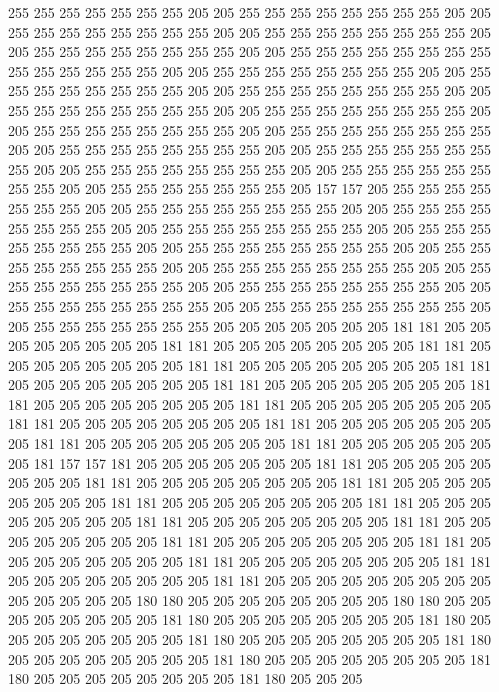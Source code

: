 255 255 255 255 255 255 255 205 205 255 255 255 255 255 255 255 255 205 205 255
255 255 255 255 255 255 255 205 205 255 255 255 255 255 255 255 255 205 205 255
255 255 255 255 255 255 255 205 205 255 255 255 255 255 255 255 255 255 255 255
255 255 255 205 205 255 255 255 255 255 255 255 255 205 205 255 255 255 255 255
255 255 255 205 205 255 255 255 255 255 255 255 255 205 205 255 255 255 255 255
255 255 255 205 205 255 255 255 255 255 255 255 255 205 205 255 255 255 255 255
255 255 255 205 205 255 255 255 255 255 255 255 255 205 205 255 255 255 255 255
255 255 255 205 205 255 255 255 255 255 255 255 255 205 205 255 255 255 255 255
255 255 255 205 205 255 255 255 255 255 255 255 255 205 205 255 255 255 255 255
255 255 205 157 157 205 255 255 255 255 255 255 255 205 205 255 255 255 255 255
255 255 255 205 205 255 255 255 255 255 255 255 255 205 205 255 255 255 255 255
255 255 255 205 205 255 255 255 255 255 255 255 255 205 205 255 255 255 255 255
255 255 255 205 205 255 255 255 255 255 255 255 255 205 205 255 255 255 255 255
255 255 255 205 205 255 255 255 255 255 255 255 255 205 205 255 255 255 255 255
255 255 255 205 205 255 255 255 255 255 255 255 255 205 205 255 255 255 255 255
255 255 255 205 205 255 255 255 255 255 255 255 205 205 205 205 205 205 205 181
181 205 205 205 205 205 205 205 205 181 181 205 205 205 205 205 205 205 205 181
181 205 205 205 205 205 205 205 205 181 181 205 205 205 205 205 205 205 205 181
181 205 205 205 205 205 205 205 205 181 181 205 205 205 205 205 205 205 205 181
181 205 205 205 205 205 205 205 205 181 181 205 205 205 205 205 205 205 205 181
181 205 205 205 205 205 205 205 205 181 181 205 205 205 205 205 205 205 205 181
181 205 205 205 205 205 205 205 205 181 181 205 205 205 205 205 205 205 181 157
157 181 205 205 205 205 205 205 205 181 181 205 205 205 205 205 205 205 205 181
181 205 205 205 205 205 205 205 205 181 181 205 205 205 205 205 205 205 205 181
181 205 205 205 205 205 205 205 205 181 181 205 205 205 205 205 205 205 205 181
181 205 205 205 205 205 205 205 205 181 181 205 205 205 205 205 205 205 205 181
181 205 205 205 205 205 205 205 205 181 181 205 205 205 205 205 205 205 205 181
181 205 205 205 205 205 205 205 205 181 181 205 205 205 205 205 205 205 205 181
181 205 205 205 205 205 205 205 205 205 205 205 205 205 205 180 180 205 205 205
205 205 205 205 205 180 180 205 205 205 205 205 205 205 205 181 180 205 205 205
205 205 205 205 205 181 180 205 205 205 205 205 205 205 205 181 180 205 205 205
205 205 205 205 205 181 180 205 205 205 205 205 205 205 205 181 180 205 205 205
205 205 205 205 205 181 180 205 205 205 205 205 205 205 205 181 180 205 205 205
